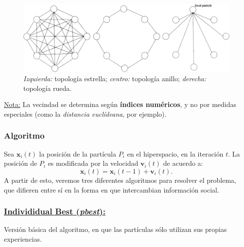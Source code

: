 \documentclass[10pt,a4paper]{article}
\begin{document}
\begin{figure}[ht!]
  \caption{\textit{Izquierda:} topología estrella; \textit{centro:} topología anillo; \textit{derecha:} topología rueda.}
  \label{fig:PSO}
  \centerline{\includegraphics[width=\textwidth-\fboxrule-\fboxrule]{imgs/PSO.png}}
\end{figure}

\underline{Nota:} La vecindad se determina según \textbf{índices numéricos}, y no por medidas especiales (como la \textit{distancia euclídeana}, por ejemplo).

\subsubsection{Algoritmo}

Sea $\mathbf{x}_i(t)$ la posición de la partícula $P_i$ en el hiperspacio, en la iteración $t$. La posición de $P_i$ es modificada por la velocidad $\mathbf{v}_i(t)$ de acuerdo a:
\begin{equation}\label{eq:mov_pso}
\mathbf{x}_i(t) = \mathbf{x}_i(t-1)+\mathbf{v}_i(t).
\end{equation}
A partir de esto, veremos tres diferentes algoritmos para resolver el problema, que difieren entre sí en la forma en que intercambian información social.

\subsubsection*{\underline{Individidual Best (\textit{pbest}):}}

Versión básica del algoritmo, en que las partículas sólo utilizan sus propias experiencias.
\end{document}
